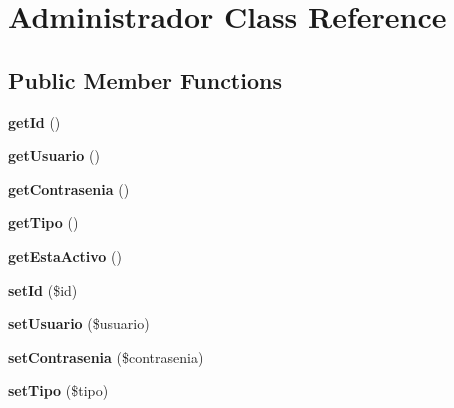 \hypertarget{class_administrador}{}\section{Administrador Class Reference}
\label{class_administrador}
\subsection*{Public Member Functions}
\begin{DoxyCompactItemize}
\item 
\mbox{\label{class_administrador_a12251d0c022e9e21c137a105ff683f13}} 
{\bfseries get\+Id} ()
\item 
\mbox{\label{class_administrador_a38abe751ca21ffb95d9c90862e0fb96f}} 
{\bfseries get\+Usuario} ()
\item 
\mbox{\label{class_administrador_a435e52a33b28962d26d59ff9fc36139a}} 
{\bfseries get\+Contrasenia} ()
\item 
\mbox{\label{class_administrador_a589f85a7401ec0dde7cb329d87b14677}} 
{\bfseries get\+Tipo} ()
\item 
\mbox{\label{class_administrador_aee7a5f0ec54dd116afc50da524b2a43e}} 
{\bfseries get\+Esta\+Activo} ()
\item 
\mbox{\label{class_administrador_a87313ad678fb2a2a8efb435cf0bdb9a0}} 
{\bfseries set\+Id} (\$id)
\item 
\mbox{\label{class_administrador_a48255b4550c8d4dc7aedf7837439461a}} 
{\bfseries set\+Usuario} (\$usuario)
\item 
\mbox{\label{class_administrador_ae1ceda2bd81bed0d084e2a5862e43e1e}} 
{\bfseries set\+Contrasenia} (\$contrasenia)
\item 
\mbox{\label{class_administrador_affc705d55128668ebea5660dcde63ada}} 
{\bfseries set\+Tipo} (\$tipo)
\item 
\mbox{\label{class_administrador_ac6dda1558ef944e2adfc76a014dc0f0c}} 

\end{DoxyCompactItemize}
